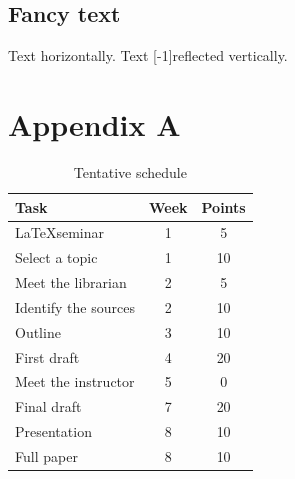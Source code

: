 \documentclass[11pt]{article}
\begin{document}
\subsection{Fancy text}

Text  horizontally.
Text \scalebox{1}[-1]{reflected} vertically.

\printbibliography

\clearpage
\section*{Appendix A}

\begin{table}[!htbp]
    \centering
    \begin{tabular}{|l|c|c|}
        \hline
        Task                 & Week & Points \\
        \hline
        \LaTeX seminar       & 1    & 5      \\
        Select a topic       & 1    & 10     \\
        Meet the librarian   & 2    & 5      \\
        Identify the sources & 2    & 10     \\
        Outline              & 3    & 10     \\
        First draft          & 4    & 20     \\
        Meet the instructor  & 5    & 0      \\
        Final draft          & 7    & 20     \\
        Presentation         & 8    & 10     \\
        Full paper           & 8    & 10     \\
        \hline
    \end{tabular}
    \caption{Tentative schedule}
    \label{tbl:schedule}
\end{table}
\end{document}
